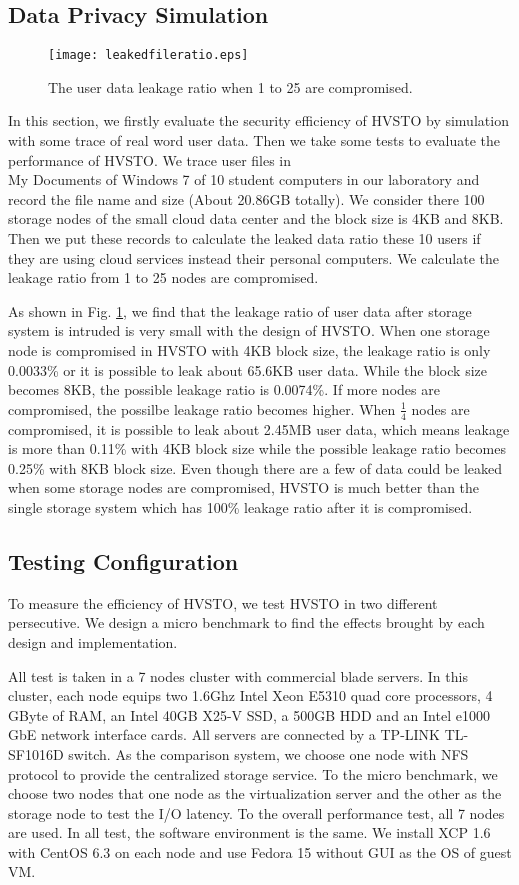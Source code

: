 \documentclass[conference]{IEEEtran}
\begin{document}
\subsection{Data Privacy Simulation}
\begin{figure}[!ht]
\centering
\texttt{[image: leakedfileratio.eps]}
\caption{The user data leakage ratio when 1 to 25 are compromised.}
\label{figure:security}
\end{figure}


In this section, we firstly evaluate the security efficiency of HVSTO by simulation with some trace of real word user data. Then we take some tests to evaluate the performance of HVSTO. We trace user files in \\My Documents of Windows 7 of 10 student computers in our laboratory and record the file name and size (About 20.86GB totally). We consider there 100 storage nodes of the small cloud data center and the block size is 4KB and 8KB. Then we put these records to calculate the leaked data ratio these 10 users if they are using cloud services instead their personal computers. We calculate the leakage ratio from 1 to 25 nodes are compromised. 

As shown in Fig. \ref{figure:security}, we find that the leakage ratio of user data after storage system is intruded is very small with the design of HVSTO. When one storage node is compromised in HVSTO with 4KB block size, the leakage ratio is only 0.0033\% or it is possible to leak about 65.6KB user data. While the block size becomes 8KB, the possible leakage ratio is 0.0074\%. If more nodes are compromised, the possilbe leakage ratio becomes higher. When $\frac{1}{4}$ nodes are compromised, it is possible to leak about 
2.45MB user data, which means leakage is more than 0.11\% with 4KB block size while the possible leakage ratio becomes 0.25\% with 8KB block size. Even though there are a few of data could be leaked when some storage nodes are compromised, HVSTO is much better than the single storage system which has 100\% leakage ratio after it is compromised.

\subsection{Testing Configuration}
To measure the efficiency of HVSTO, we test HVSTO in two different persecutive. We design a micro benchmark to find the effects brought by each design and implementation.

All test is taken in a 7 nodes cluster with commercial blade servers. In this cluster,  each node equips two 1.6Ghz Intel Xeon E5310 quad core processors, 4 GByte of  RAM, an Intel 40GB X25-V SSD, a 500GB HDD and an Intel e1000 GbE network interface cards. All servers are connected by a TP-LINK TL-SF1016D switch. As the comparison system, we choose one node with NFS protocol \cite{Callaghan1995} to provide the centralized storage service. To the micro benchmark, we choose two nodes that one node as the virtualization server and the other as the storage node to test the I/O latency. To the overall performance test, all 7 nodes are used. In all test, the software environment is the same. We install XCP 1.6 with CentOS 6.3 on each node and use Fedora 15 without GUI as the OS of guest VM.
\end{document}
